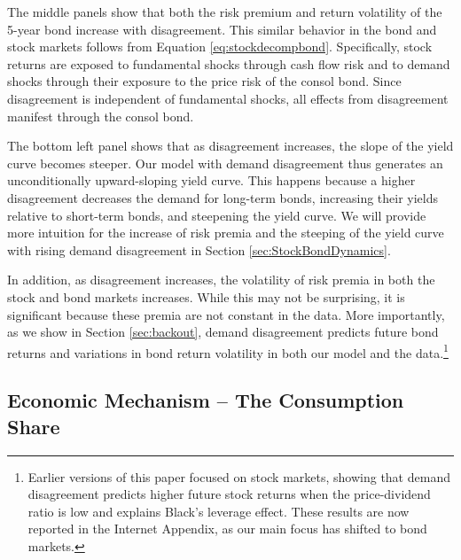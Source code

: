 \documentclass[preprint,11pt,authoryear]{elsarticle}
\theoremstyle{plain}
\begin{document}
 The middle panels show that both the risk premium and return volatility of the 5-year bond increase with disagreement. This similar behavior in the bond and stock markets follows from Equation \eqref{eq:stockdecompbond}. Specifically, stock returns are exposed to fundamental shocks through cash flow risk and to demand shocks through their exposure to the price risk of the consol bond. Since disagreement is independent of fundamental shocks, all effects from disagreement manifest through the consol bond.

The bottom left panel shows that as disagreement increases, the slope of the yield curve becomes steeper. Our model with demand disagreement thus generates an unconditionally upward-sloping yield curve. This happens because a higher disagreement decreases the demand for long-term bonds, increasing their yields relative to short-term bonds, and steepening the yield curve. We will provide more intuition for the increase of risk premia and the steeping of the yield curve with rising demand disagreement in Section \ref{sec:StockBondDynamics}.

In addition, as disagreement increases, the volatility of risk premia in both the stock and bond markets increases. While this may not be surprising, it is significant because these premia are not constant in the data. More importantly, as we show in Section \ref{sec:backout}, demand disagreement predicts future bond returns and variations in bond return volatility in both our model and the data.\footnote{Earlier versions of this paper focused on stock markets, showing that demand disagreement predicts higher future stock returns when the price-dividend ratio is low and explains Black's leverage effect. These results are now reported in the Internet Appendix, as our main focus has shifted to bond markets.}



\subsection{Economic Mechanism -- The Consumption Share}
\end{document}
